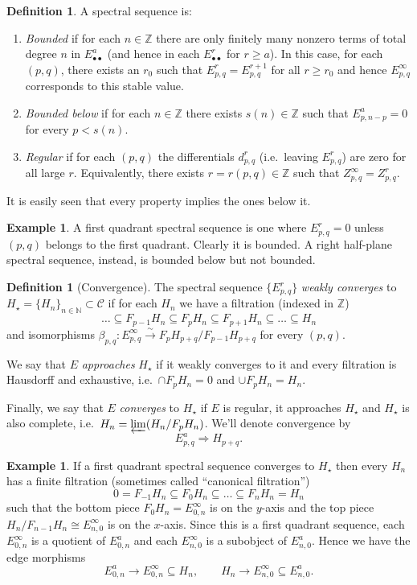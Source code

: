 \documentclass[a4paper]{article}
\newcommand{\N}{ \mathbb{N} }
\newcommand{\Z}{ \mathbb{Z} }
\newcommand{\C}{\mathcal{C}}
\newcommand{\Hs}{ H_{\star} }
\newcommand{\plim}{ \varprojlim }
\newcommand{\bb}{\bullet\bullet}
\theoremstyle{plain}
\theoremstyle{definition}
\newtheorem{defn}[thm]{Definition}
\newtheorem{example}[thm]{Example}
\begin{document}
		\begin{defn}
			A spectral sequence is:
			\begin{enumerate}
				 \item \emph{Bounded} if for each $n \in \Z$ there are only finitely many nonzero terms of total degree $n$ in $E^a_{\bb}$ (and hence in each $E^r_{\bb}$ for $r \geq a$). In this case, for each $(p,q)$, there exists an $r_0$ such that $E^r_{p,q} = E^{r+1}_{p,q}$ for all $r \geq r_0$ and hence $E^{\infty}_{p,q}$ corresponds to this stable value.
				\item \emph{Bounded below} if for each $n \in \Z$ there exists $s(n) \in \Z$ such that $E^a_{p, n-p} = 0$ for every $p < s(n)$.
				\item \emph{Regular} if for each $(p, q)$ the differentials $d^r_{p,q}$ (i.e.\ leaving $E^r_{p,q}$) are zero for all large $r$. Equivalently, there exists $r = r(p,q) \in \Z$ such that $Z^{\infty}_{p,q} = Z^r_{p,q}$.
			\end{enumerate}
			It is easily seen that every property implies the ones below it.
		\end{defn}
		\begin{example}
			A first quadrant spectral sequence is one where $E^r_{p,q} = 0$ unless $(p,q)$ belongs to the first quadrant. Clearly it is bounded.
			A right half-plane spectral sequence, instead, is bounded below but not bounded.
		\end{example}
		\begin{defn}[Convergence]
			\label{defn:convergence}
			The spectral sequence $\{E^r_{p,q}\}$ \emph{weakly converges} to $H_{\star} = \{H_n\}_{n \in \N} \subset \C$ if for each $H_n$ we have a filtration (indexed in $\Z$)
			\[
				\dots \subseteq F_{p-1}H_n \subseteq F_pH_n \subseteq F_{p+1}H_n \subseteq \dots \subseteq H_n
			\]
			and isomorphisms $\beta_{p,q}\colon E^{\infty}_{p,q} \xrightarrow{\sim} F_pH_{p+q}/F_{p-1}H_{p+q}$ for every $(p,q)$. 
			
			We say that $E$ \emph{approaches} $H_{\star}$ if it weakly converges to it and every filtration is Hausdorff and exhaustive, i.e.\ $\cap F_pH_n = 0$ and $\cup F_pH_n = H_n$.
			
			Finally, we say that $E$ \emph{converges} to $H_{\star}$ if $E$ is regular, it approaches $H_{\star}$ and $H_{\star}$ is also complete, i.e.\ $H_n = \plim (H_n/F_pH_n)$. We'll denote convergence by
			\[
				E^a_{p,q} \Longrightarrow H_{p+q}.
			\]
		\end{defn}
		\begin{example}
			If a first quadrant spectral sequence converges to $\Hs$ then every $H_n$ has a finite filtration (sometimes called ``canonical filtration'')
			\[
				0 = F_{-1}H_n \subseteq F_0H_n \subseteq \dots \subseteq F_nH_n = H_n
			\]
			such that the bottom piece $F_0H_n = E^{\infty}_{0,n}$ is on the $y$-axis and the top piece $H_n/F_{n-1}H_n \cong E^{\infty}_{n,0}$ is on the $x$-axis. Since this is a first quadrant sequence, each $E^{\infty}_{0,n}$ is a quotient of $E^a_{0,n}$ and each $E^{\infty}_{n,0}$ is a subobject of $E^a_{n,0}$. Hence we have the edge morphisms
			\[
				E^a_{0,n} \to E^{\infty}_{0,n} \subseteq H_n, \qquad H_n \to E^{\infty}_{n,0} \subseteq E^a_{n,0}.
			\]
		\end{example}
\end{document}
